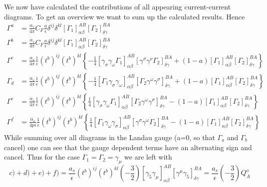 	We now have calculated the contributions of all appearing current-current diagrams. To get an overview we want to sum up the calculated results. Hence
	\begin{align}
		\Gamma^a &= \frac{\alpha_s}{4\pi} C_F \frac{a}{\epsilon} \delta^{ij} \delta^{kl} [\Gamma_1]^{AB}_{\alpha\beta} [\Gamma_2]^{BA}_{\delta\gamma} \\
		\Gamma^b &= \frac{\alpha_s}{4\pi} C_F \frac{a}{\epsilon} \delta^{ij} \delta^{kl} [\Gamma_1]^{AB}_{\alpha\beta} [\Gamma_2]^{BA}_{\delta\gamma} \\
		\Gamma^c &= \frac{\alpha_s}{4\pi}\frac{1}{\epsilon} (t^b)^{ij}(t^b)^{kl} \left\{ -\frac{1}{4} \left[\gamma_\sigma \gamma_\omega \Gamma_1\right]^{AB}_{\alpha\beta} \left[\gamma^\sigma\gamma^\nu\Gamma_2\right]^{BA}_{\delta\gamma} + (1-a) \left[\Gamma_1\right]^{AB}_{\alpha\beta}\left[\Gamma_2\right]^{BA}_{\delta\gamma}\right\} \\
		\Gamma_d &= \frac{\alpha_s}{4\pi}\frac{1}{\epsilon} (t^b)^{ij} (t^b)^{kl}  \left\{ -\frac{1}{4}\left[\Gamma_1 \gamma_\sigma \gamma_\omega\right]^{AB}_{\alpha\beta} \left[ \Gamma_2 \gamma^\omega \gamma^\sigma \right]^{BA}_{\delta\gamma} + (1-a) \left[\Gamma_1\right]^{AB}_{\alpha\beta} \left[ \Gamma_2\right]^{BA}_{\delta\gamma}\right\} \\
		\Gamma^e &= \frac{\alpha_s}{4\pi}\frac{1}{\epsilon}(t^b)^{ij} (t^b)^{kl}  \left\{ \frac{1}{4}\left[ \gamma_\sigma \gamma_\omega \Gamma_1 \right]^{AB}_{\alpha\beta} \left[\Gamma_2 \gamma^\omega \gamma^\sigma \right]^{BA}_{\delta\gamma}- (1-a) \left[\Gamma_1\right]^{AB}_{\alpha\beta} \left[\Gamma_2\right]^{BA}_{\delta\gamma} \right\}  \\
		\Gamma^f &= \frac{\alpha_s}{4pi}\frac{1}{\epsilon} (t^b)^{ij}(t^b)^{kl} \left\{\frac{1}{4}\left[\Gamma_1\gamma_\omega \gamma_\sigma\right]^{AB}_{\alpha\beta}\left[\gamma^\sigma\gamma^\omega\Gamma_2\right]^{BA}_{\delta\gamma} -(1-a)\left[\Gamma_1\right]^{AB}_{\alpha\beta} \left[\Gamma_2\right]^{BA}_{\delta\gamma} \right\} 
	\end{align}
	While summing over all diagrams in the Landau gauge (a=0, so that $\Gamma_a$ and $\Gamma_b$ cancel) one can see that the gauge dependent terms have an alternating sign and cancel. Thus for the case $\Gamma_1 = \Gamma_2 = \gamma_\mu$ we are left with
	\begin{equation}
		c)+d)+e)+f) = \frac{a_s}{\epsilon} (t^b)^{ij} (t^b)^{kl} \left(-\frac{3}{2}\right) \left[\gamma_5 \gamma_\mu\right]^{AB}_{\alpha\beta} \left[\gamma^\mu \gamma_5 \right]^{BA}_{\delta\gamma} = \frac{a_s}{\epsilon}\left(-\frac{3}{2}\right) Q^o_A 
	\end{equation}
